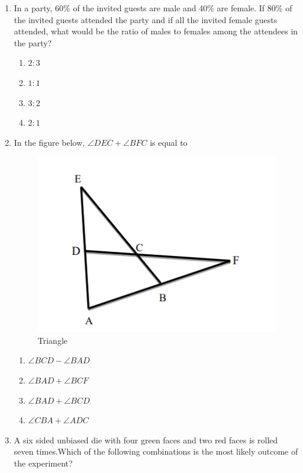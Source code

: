 \documentclass[journal,12pt,onecolumn]{IEEEtran}
\theoremstyle{remark}
\begin{document}
\begin{enumerate}
\hfill{}
\begin{multicols}{4}
\begin{enumerate}
\item $-1$ 
\item $\frac{1}{pqr}$ 
\item $1$
\item $pqr$
\end{enumerate}
\end{multicols}
\item In a party, 60\% of the invited guests are male and 40\% are female. If 80\% of the invited
guests attended the party and if all the invited female guests attended, what would be the ratio of males to females among the attendees in the party?


\hfill{}
\begin{multicols}{4}
\begin{enumerate}
\item $2\colon3$
\item $1\colon1$ 
\item $3\colon2$
\item $2\colon1$
\end{enumerate}
\end{multicols}
\item In the figure below, $\angle DEC + \angle BFC$ is equal to
\begin{figure}[H]
  \centering
  \includegraphics[width=0.4\columnwidth]{figs/angles.png}
  \caption{Triangle}
  \label{fig:angle}
\end{figure}

\hfill{}
  \begin{multicols}{2}
  \begin{enumerate}
    \item $\angle BCD - \angle BAD$
    \item $\angle BAD + \angle BCF$  
    \item $\angle BAD + \angle BCD$
    \item $\angle CBA + \angle ADC$
\end{enumerate}
  \end{multicols}
\item A six sided unbiased die with four green faces and two red faces is rolled seven times.Which of the following combinations is the most likely outcome of the experiment?


\end{enumerate}
\end{document}
